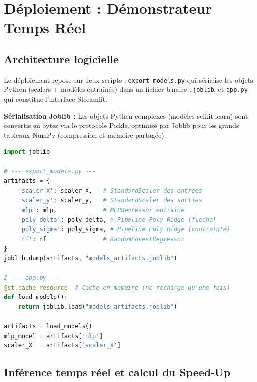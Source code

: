 \documentclass[journal, a4paper, twocolumn]{IEEEtran}
\begin{document}
\section{Déploiement : Démonstrateur Temps Réel}

\subsection{Architecture logicielle}

Le déploiement repose sur deux scripts : \texttt{export\_models.py} qui sérialise les objets Python (scalers + modèles entraînés) dans un fichier binaire \texttt{.joblib}, et \texttt{app.py} qui constitue l'interface Streamlit.

\textbf{Sérialisation Joblib :} Les objets Python complexes (modèles scikit-learn) sont convertis en bytes via le protocole Pickle, optimisé par Joblib pour les grands tableaux NumPy (compression et mémoire partagée).

\begin{lstlisting}[language=Python, caption=Sérialisation et chargement des modèles (Joblib)]
import joblib

# --- export_models.py ---
artifacts = {
    'scaler_X': scaler_X,   # StandardScaler des entrees
    'scaler_y': scaler_y,   # StandardScaler des sorties
    'mlp': mlp,             # MLPRegressor entraine
    'poly_delta': poly_delta, # Pipeline Poly Ridge (fleche)
    'poly_sigma': poly_sigma, # Pipeline Poly Ridge (contrainte)
    'rf': rf                # RandomForestRegressor
}
joblib.dump(artifacts, "models_artifacts.joblib")

# --- app.py ---
@st.cache_resource  # Cache en memoire (ne recharge qu'une fois)
def load_models():
    return joblib.load("models_artifacts.joblib")

artifacts = load_models()
mlp_model = artifacts['mlp']
scaler_X  = artifacts['scaler_X']
\end{lstlisting}

\subsection{Inférence temps réel et calcul du Speed-Up}
\end{document}

